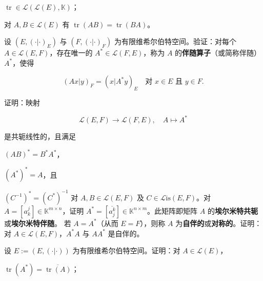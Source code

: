 \begin{exercises}
\begin{subitems}
$ \operatorname{tr} \in \mathcal{L}(\mathcal{L}(E), \mathbb{K}) $；

\item

对 $ A, B \in \mathcal{L}(E) $ 有 $ \operatorname{tr}(AB) = \operatorname{tr}(BA) $。

\end{subitems}

\item

设 $ (E, (\cdot|\cdot)_E) $ 与 $ (F, (\cdot|\cdot)_F) $ 为有限维希尔伯特空间。验证：对每个 $ A \in \mathcal{L}(E, F) $，存在唯一的 $ A^{*} \in \mathcal{L}(F, E) $，称为 $ A $ 的\textbf{伴随算子}（或简称伴随）$ A^{*} $，使得

\[
(Ax|y)_F = (x|A^{*}y)_E \quad \text{对 } x \in E \text{ 且 } y \in F .
\]

证明：映射

\[
\mathcal{L}(E, F) \to \mathcal{L}(F, E) , \quad A \mapsto A^{*}
\]

是共轭线性的，且满足

\begin{subitems}
\item

$ (AB)^{*} = B^{*}A^{*} $，

\item

$ (A^{*})^{*} = A $，且

\item

$ (C^{-1})^{*} = (C^{*})^{-1} $
对 $ A, B \in \mathcal{L}(E, F) $ 及 $ C \in \mathcal{L}\mathrm{is}(E, F) $。对 $ A = [a_{k}^{j}] \in \mathbb{K}^{m \times n} $，证明 $ A^{*} = \left[ \overline{a_{j}^{k}} \right] \in \mathbb{K}^{n \times m} $。此矩阵即矩阵 $ A $ 的\textbf{埃尔米特共轭}或\textbf{埃尔米特伴随}。
若 $ A = A^{*} $（从而 $ E = F $），则称 $ A $ 为\textbf{自伴的}或\textbf{对称的}。证明：对 $ A \in \mathcal{L}(E, F) $，$ A^{*}A $ 与 $ AA^{*} $ 是自伴的。

\end{subitems}

\item

设 $ E := (E, (\cdot|\cdot)) $ 为有限维希尔伯特空间。证明：对 $ A \in \mathcal{L}(E) $，

\begin{subitems}
\item

$ \operatorname{tr}(A^{*}) = \overline{\operatorname{tr}(A)} $；


\end{subitems}
\end{exercises}
